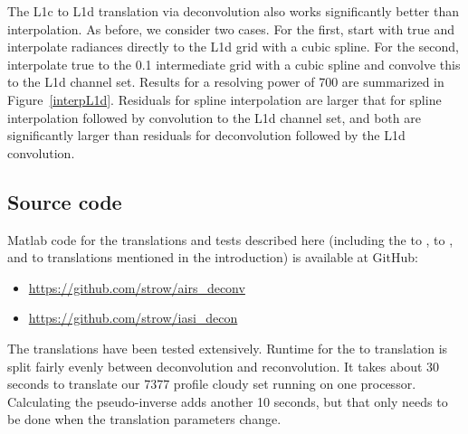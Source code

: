 \documentclass[journal]{IEEEtran}
\begin{document}
The {\airs} L1c to L1d translation via deconvolution also works
significantly better than interpolation.  As before, we consider 
two cases.  For the first, start with true {\airs} and interpolate
radiances directly to the L1d grid with a cubic spline.  For the
second, interpolate true {\airs} to the 0.1 {\wn} intermediate grid
with a cubic spline and convolve this to the L1d channel set.
Results for a resolving power of 700 are summarized in
Figure~\ref{interpL1d}.  Residuals for spline interpolation are
larger that for spline interpolation followed by convolution to the
L1d channel set, and both are significantly larger than residuals
for {\airs} deconvolution followed by the L1d convolution.

\subsection{Source code}

Matlab code for the translations and tests described here (including
the {\iasi} to {\cris}, {\iasi} to {\airs}, and {\cris} to {\airs}
translations mentioned in the introduction) is available at GitHub:

\begin{itemize}
   \item \url{https://github.com/strow/airs_deconv}
   \item \url{https://github.com/strow/iasi_decon}
\end{itemize}

The translations have been tested extensively.  Runtime for the
{\airs} to {\cris} translation is split fairly evenly between
deconvolution and reconvolution.  It takes about 30 seconds to
translate our 7377 profile cloudy set running on one processor.
Calculating the pseudo-inverse adds another 10 seconds, but that
only needs to be done when the translation parameters change.


% 
% 



\end{document}
